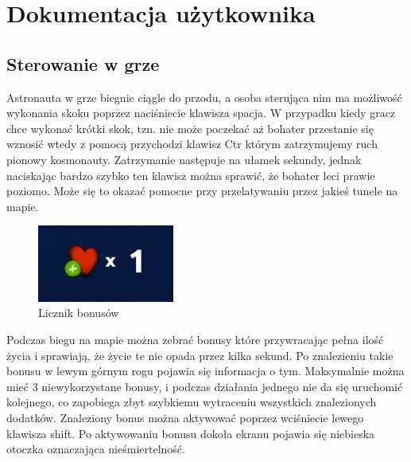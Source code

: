 \chapter{Dokumentacja użytkownika} 
\section{Sterowanie w grze}
Astronauta w grze biegnie ciągle do przodu, a osoba sterująca nim ma możliwość wykonania skoku poprzez naciśniecie klawisza spacja. W przypadku kiedy gracz chce wykonać krótki skok, tzn. nie może poczekać aż bohater przestanie się wznosić wtedy z pomocą przychodzi klawisz Ctr którym zatrzymujemy ruch pionowy kosmonauty. Zatrzymanie następuje na ułamek sekundy, jednak naciskając bardzo szybko ten klawisz można sprawić, że bohater leci prawie poziomo. Może się to okazać pomocne przy przelatywaniu przez jakieś tunele na mapie. 


\begin{figure}
\begin{center}
\includegraphics[width=170px]{./Pictures/ilosczycia.png}
\end{center}
\caption{Licznik bonusów}
\label{Etykieta}
\end{figure}

Podczas biegu na mapie można zebrać bonusy które przywracając pełna ilość życia i sprawiają, że życie te nie opada przez kilka sekund. Po znalezieniu takie bonusu w lewym górnym rogu pojawia się informacja o tym. Maksymalnie można mieć 3 niewykorzystane bonusy, i podczas działania jednego nie da się uruchomić kolejnego, co zapobiega zbyt szybkiemu wytraceniu wszystkich znalezionych dodatków. Znaleziony bonus można aktywować poprzez wciśniecie lewego klawisza shift. Po aktywowaniu bonusu dokoła ekranu pojawia się niebieska otoczka oznaczająca nieśmiertelność. 


